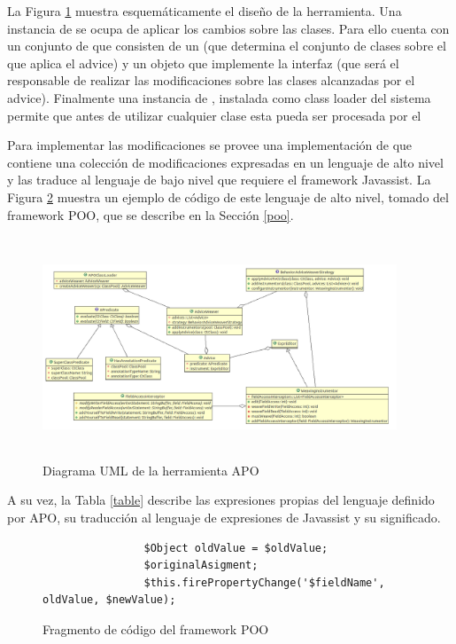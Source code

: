 		La Figura \ref{aopImage} muestra esquemáticamente el diseño de la herramienta.
		Una instancia de  se ocupa de aplicar los cambios sobre las
		clases.
		Para ello cuenta con un conjunto de  que consisten de un
		 (que determina el conjunto de clases sobre el que aplica el
		advice) y un objeto que implemente la interfaz  (que
		será el responsable de realizar las modificaciones sobre
		las clases alcanzadas por el advice).
		Finalmente una instancia de , instalada como class loader
		del sistema permite que antes de utilizar cualquier clase esta pueda ser procesada por el 
		
		Para implementar las modificaciones se provee una implementación de
		 que contiene una colección de modificaciones expresadas en un
		lenguaje de alto nivel y las traduce al lenguaje de bajo nivel que requiere el
		framework Javassist.
		La Figura \ref{pooCode} muestra un ejemplo de código de este lenguaje de alto nivel,
		tomado del framework POO, que se describe en la Sección \ref{poo}.
		
		\begin{figure}[h]
			\centering
			\includegraphics[width=400px, height=250px]{img/aop}
			\caption{Diagrama UML de la herramienta APO}
			\label{aopImage}
		\end{figure}	
		
		
		A su vez, la Tabla \ref{table} describe las expresiones propias del lenguaje
		definido por APO, su traducción al lenguaje de expresiones de
		Javassist y su significado.
		
		\begin{figure}[h]
			\begin{lstlisting}
				$Object oldValue = $oldValue;
			  	$originalAsigment;
			  	$this.firePropertyChange('$fieldName', oldValue, $newValue);
			\end{lstlisting}
			\caption{Fragmento de código del framework POO}
			\label{pooCode}
		\end{figure}
		
